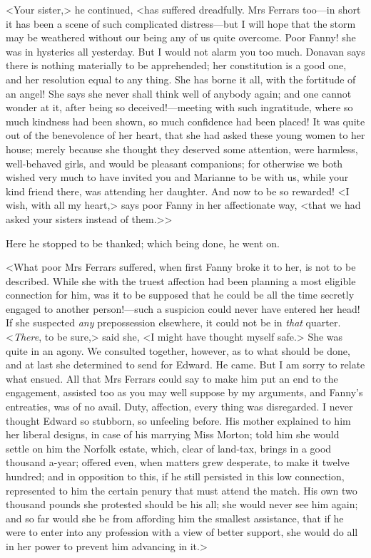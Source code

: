 <Your sister,> he continued, <has suffered dreadfully. Mrs Ferrars too—in short it has been a scene of such complicated distress—but I will hope that the storm may be weathered without our being any of us quite overcome. Poor Fanny! she was in hysterics all yesterday. But I would not alarm you too much. Donavan says there is nothing materially to be apprehended; her constitution is a good one, and her resolution equal to any thing. She has borne it all, with the fortitude of an angel! She says she never shall think well of anybody again; and one cannot wonder at it, after being so deceived!—meeting with such ingratitude, where so much kindness had been shown, so much confidence had been placed! It was quite out of the benevolence of her heart, that she had asked these young women to her house; merely because she thought they deserved some attention, were harmless, well-behaved girls, and would be pleasant companions; for otherwise we both wished very much to have invited you and Marianne to be with us, while your kind friend there, was attending her daughter. And now to be so rewarded! <I wish, with all my heart,> says poor Fanny in her affectionate way, <that we had asked your sisters instead of them.>>

Here he stopped to be thanked; which being done, he went on.

<What poor Mrs Ferrars suffered, when first Fanny broke it to her, is not to be described. While she with the truest affection had been planning a most eligible connection for him, was it to be supposed that he could be all the time secretly engaged to another person!—such a suspicion could never have entered her head! If she suspected \textit{any} prepossession elsewhere, it could not be in \textit{that} quarter. <\textit{There}, to be sure,> said she, <I might have thought myself safe.> She was quite in an agony. We consulted together, however, as to what should be done, and at last she determined to send for Edward. He came. But I am sorry to relate what ensued. All that Mrs Ferrars could say to make him put an end to the engagement, assisted too as you may well suppose by my arguments, and Fanny's entreaties, was of no avail. Duty, affection, every thing was disregarded. I never thought Edward so stubborn, so unfeeling before. His mother explained to him her liberal designs, in case of his marrying Miss Morton; told him she would settle on him the Norfolk estate, which, clear of land-tax, brings in a good thousand a-year; offered even, when matters grew desperate, to make it twelve hundred; and in opposition to this, if he still persisted in this low connection, represented to him the certain penury that must attend the match. His own two thousand pounds she protested should be his all; she would never see him again; and so far would she be from affording him the smallest assistance, that if he were to enter into any profession with a view of better support, she would do all in her power to prevent him advancing in it.>

